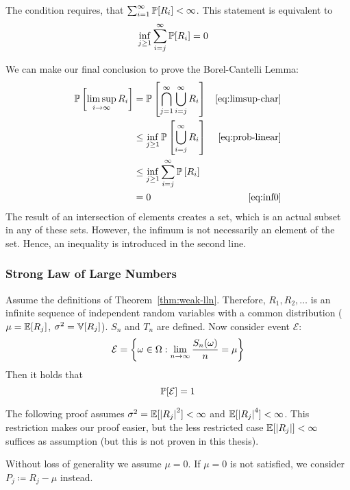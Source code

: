 The condition requires, that $\sum_{i=1}^\infty \mathbb P[R_i] < \infty$.
This statement is equivalent to
\begin{align}
  \inf_{j \geq 1} \sum_{i=j}^\infty \mathbb P[R_i] &= 0  \label{eq:inf0}
\end{align}

We can make our final conclusion to prove the Borel-Cantelli Lemma:
\begin{align}
  \mathbb P\left[\limsup_{i\to\infty} R_i\right]
    &= \mathbb P\left[\bigcap_{j=1}^\infty \bigcup_{i=j}^\infty R_i\right] & \eqref{eq:limsup-char} \notag\\
    &\leq \inf_{j \geq 1} \mathbb P\left[\bigcup_{i=j}^\infty R_i\right] & \eqref{eq:prob-linear}\notag\\
    &\leq \inf_{j \geq 1} \sum_{i=j}^\infty \mathbb P\left[R_i\right] \notag\\
    &= 0 & \eqref{eq:inf0}
\end{align}
The result of an intersection of elements creates a set, which
is an actual subset in any of these sets. However, the infimum
is not necessarily an element of the set. Hence, an inequality
is introduced in the second line.

\subsubsection{Strong Law of Large Numbers}
\label{sec:bp-strong-law}
%
\begin{theorem}\label{thm:lln}
  Assume the definitions of Theorem~\ref{thm:weak-lln}.
  Therefore, $R_1, R_2, \ldots$ is an infinite sequence of independent random variables
  with a common distribution ($\mu = \mathbb E[R_j]$, $\sigma^2 = \mathbb V[R_j]$). $S_n$ and $T_n$
  are defined. Now consider event $\mathcal E$:
  \[
    \mathcal E = \left\{
      \omega \in \Omega: \lim_{n\to\infty} \frac{S_n(\omega)}{n} = \mu
    \right\}
  \]
  Then it holds that
  \[ \mathbb P[\mathcal E] = 1 \]
\end{theorem}

The following proof assumes $\sigma^2 = \mathbb E[\left\lvert{R_j}\right\rvert^2] < \infty$ and $\mathbb E[\left\lvert{R_j}\right\rvert^4] < \infty$.
This restriction makes our proof easier, but the less restricted case $\mathbb E[\left\lvert{R_j}\right\rvert] < \infty$ suffices as assumption
(but this is not proven in this thesis).

Without loss of generality we assume $\mu = 0$.
If $\mu = 0$ is not satisfied, we consider $P_j \coloneqq R_j - \mu$ instead.

